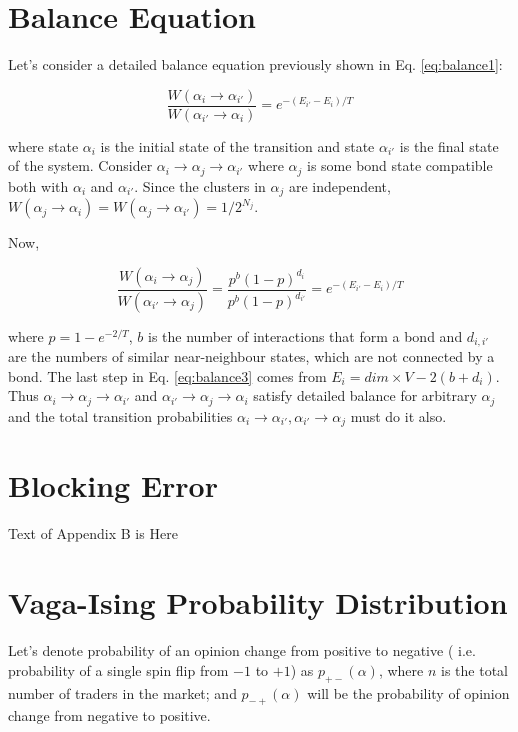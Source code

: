 \newpage
\appendix
\section{Balance Equation}
\label{balance}

Let's consider a detailed balance equation previously shown in Eq. \ref{eq:balance1}:

\begin{equation}
	\frac{W(\alpha_{i} \to \alpha_{i'})}{W(\alpha_{i'} \to \alpha_{i})} = e^{-(E_{i'} - E_{i})/T}
\end{equation}

where state $\alpha_{i}$ is the initial state of the transition and state $\alpha_{i'}$ is the final state of the system. Consider $\alpha_{i} \to \alpha_{j} \to \alpha_{i'}$ where $\alpha_{j}$ is some bond state compatible both with $\alpha_{i}$ and $\alpha_{i'}$. Since the clusters in $\alpha_{j}$ are independent, $W(\alpha_{j} \to \alpha_{i}) = W(\alpha_{j} \to \alpha_{i'}) = 1/2^{N_j}$.

Now,

\begin{equation}
\label{eq:balance3}
	\frac{W(\alpha_{i} \to \alpha_{j})}{W(\alpha_{i'} \to \alpha_{j})} = 
	\frac{p^{b}(1-p)^{d_i}}{p^b(1-p)^{d_{i'}}} = 
	e^{-(E_{i'} - E_{i})/T}
\end{equation}

where $p = 1- e^{-2/T}$, $b$ is the number of interactions that form a bond and $d_{i,i'}$ are the numbers of similar near-neighbour states, which are not connected by a bond. The last step in Eq. \ref{eq:balance3} comes from $E_{i} = dim \times V - 2(b+d_{i})$. Thus $\alpha_{i} \to \alpha_{j} \to \alpha_{i'}$ and $\alpha_{i'} \to \alpha_{j} \to \alpha_{i}$ satisfy detailed balance for arbitrary $\alpha_{j}$ and the total transition probabilities $\alpha_{i} \to \alpha_{i'}, \alpha_{i'} \to \alpha_{j}$ must do it also.

\section{Blocking Error}

Text of Appendix B is Here

\section{Vaga-Ising Probability Distribution}
\label{vaga_ising}

Let's denote probability of an opinion change from positive to negative ( i.e. probability of a single spin flip from $-1$ to $+1$) as $p_{+-}(\alpha)$, where $n$ is the total number of traders in the market; and $p_{-+}(\alpha)$ will be the probability of opinion change from negative to positive.